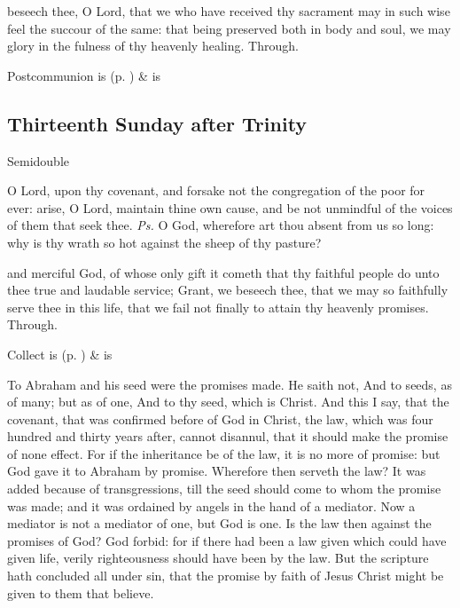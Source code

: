 
\postcommunion
{} beseech thee, O Lord, that we who have received thy sacrament may in such wise feel the succour of the same: that being preserved both in body and soul, we may glory in the fulness of thy heavenly healing. Through.
\begin{rubric}
     Postcommunion is  (p. \pageref{SPSaints}) \&  is 
\end{rubric}


\clearpage
\subsection{Thirteenth Sunday after Trinity}
\begin{inhead}
{Semidouble}
\end{inhead}


\introit
{} O Lord, upon thy covenant, and forsake not the congregation of the poor for ever: arise, O Lord, maintain thine own cause, and be not unmindful of the voices of them that seek thee. \textit{Ps.} O God, wherefore art thou absent from us so long: why is thy wrath so hot against the sheep of thy pasture?

\collect
{} and merciful God, of whose only gift it cometh that thy faithful people do unto thee true and laudable service; Grant, we beseech thee, that we may so faithfully serve thee in this life, that we fail not finally to attain thy heavenly promises. Through.
\begin{rubric}
     Collect is  (p. \pageref{SPSaints}) \&  is 
\end{rubric}

 To Abraham and his seed were the promises made. He saith not, And to seeds, as of many; but as of one, And to thy seed, which is Christ. And this I say, that the covenant, that was confirmed before of God in Christ, the law, which was four hundred and thirty years after, cannot disannul, that it should make the promise of none effect. For if the inheritance be of the law, it is no more of promise: but God gave it to Abraham by promise. Wherefore then serveth the law? It was added because of transgressions, till the seed should come to whom the promise was made; and it was ordained by angels in the hand of a mediator. Now a mediator is not a mediator of one, but God is one. Is the law then against the promises of God? God forbid: for if there had been a law given which could have given life, verily righteousness should have been by the law. But the scripture hath concluded all under sin, that the promise by faith of Jesus Christ might be given to them that believe.

